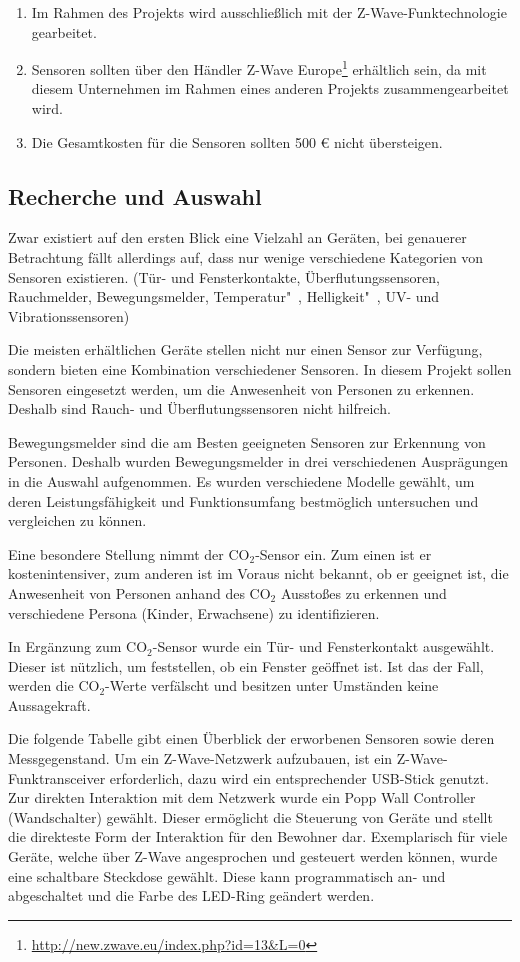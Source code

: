 \begin{enumerate}
	\item Im Rahmen des Projekts wird ausschließlich mit der Z-Wave-Funktechnologie gearbeitet.
	\item Sensoren sollten über den Händler Z-Wave Europe\footnote{\url{http://new.zwave.eu/index.php?id=13\&L=0}} erhältlich sein, da mit diesem Unternehmen im Rahmen eines anderen Projekts zusammengearbeitet wird.
	\item Die Gesamtkosten für die Sensoren sollten 500 € nicht übersteigen.
\end{enumerate}

\subsection{Recherche und Auswahl}
Zwar existiert auf den ersten Blick eine Vielzahl an Geräten, bei genauerer Betrachtung fällt allerdings auf, dass nur wenige verschiedene Kategorien von Sensoren existieren. (Tür- und Fensterkontakte, Überflutungssensoren, Rauchmelder, Bewegungsmelder, Temperatur"~, Helligkeit"~, UV- und Vibrationssensoren)

Die meisten erhältlichen Geräte stellen nicht nur einen Sensor zur Verfügung, sondern bieten eine Kombination verschiedener Sensoren. In diesem Projekt sollen Sensoren eingesetzt werden, um die Anwesenheit von Personen zu erkennen. Deshalb sind Rauch- und Überflutungssensoren nicht hilfreich.

Bewegungsmelder sind die am Besten geeigneten Sensoren zur Erkennung von Personen. Deshalb wurden Bewegungsmelder in drei verschiedenen Ausprägungen in die Auswahl aufgenommen. Es wurden verschiedene Modelle gewählt, um deren Leistungsfähigkeit und Funktionsumfang bestmöglich untersuchen und vergleichen zu können.

Eine besondere Stellung nimmt der CO$_2$-Sensor ein. Zum einen ist er kostenintensiver, zum anderen ist im Voraus nicht bekannt, ob er geeignet ist, die Anwesenheit von Personen anhand des CO$_2$ Ausstoßes zu erkennen und verschiedene Persona (Kinder, Erwachsene) zu identifizieren.

In Ergänzung zum CO$_2$-Sensor wurde ein Tür- und Fensterkontakt ausgewählt. Dieser ist nützlich, um feststellen, ob ein Fenster geöffnet ist. Ist das der Fall, werden die CO$_2$-Werte verfälscht und besitzen unter Umständen keine Aussagekraft.

Die folgende Tabelle gibt einen Überblick der erworbenen Sensoren sowie deren  Messgegenstand. Um ein Z-Wave-Netzwerk aufzubauen, ist ein Z-Wave-Funktransceiver erforderlich, dazu wird ein entsprechender USB-Stick genutzt. Zur direkten Interaktion mit dem Netzwerk wurde ein Popp Wall Controller (Wandschalter) gewählt. Dieser ermöglicht die Steuerung von Geräte und stellt die direkteste Form der Interaktion für den Bewohner dar. Exemplarisch für viele Geräte, welche über Z-Wave angesprochen und gesteuert werden können, wurde eine schaltbare Steckdose gewählt. Diese kann programmatisch an- und abgeschaltet und die Farbe des LED-Ring geändert werden.

